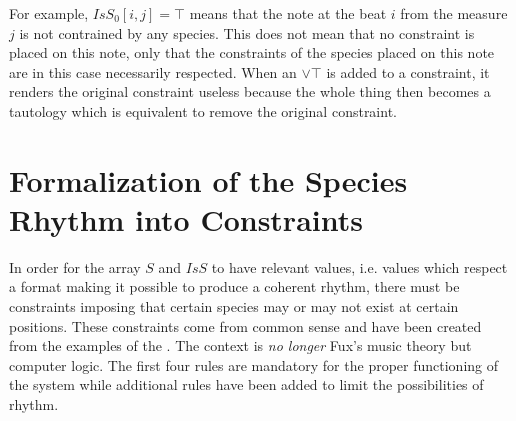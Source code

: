 For example, $IsS_{0}[i, j] = \top$ means that the note at the beat $i$ from the measure $j$ is not contrained by any species. This does not mean that no constraint is placed on this note, only that the constraints of the species placed on this note are in this case necessarily respected. When an $\lor \top$ is added to a constraint, it renders the original constraint useless because the whole thing then becomes a tautology which is equivalent to remove the original constraint.

\section{Formalization of the Species Rhythm into Constraints}
In order for the array $S$ and $IsS$ to have relevant values, i.e. values which respect a format making it possible to produce a coherent rhythm, there must be constraints imposing that certain species may or may not exist at certain positions. These constraints come from common sense and have been created from the examples of the . The context is \emph{no longer} Fux's music theory but computer logic. The first four rules are mandatory for the proper functioning of the system while additional rules have been added to limit the possibilities of rhythm.

